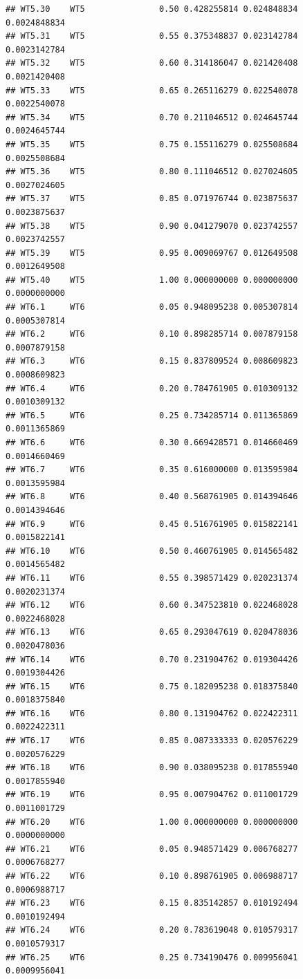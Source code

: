 \documentclass[
]{book}
\begin{document}
\begin{verbatim}
## WT5.30    WT5               0.50 0.428255814 0.024848834 0.0024848834
## WT5.31    WT5               0.55 0.375348837 0.023142784 0.0023142784
## WT5.32    WT5               0.60 0.314186047 0.021420408 0.0021420408
## WT5.33    WT5               0.65 0.265116279 0.022540078 0.0022540078
## WT5.34    WT5               0.70 0.211046512 0.024645744 0.0024645744
## WT5.35    WT5               0.75 0.155116279 0.025508684 0.0025508684
## WT5.36    WT5               0.80 0.111046512 0.027024605 0.0027024605
## WT5.37    WT5               0.85 0.071976744 0.023875637 0.0023875637
## WT5.38    WT5               0.90 0.041279070 0.023742557 0.0023742557
## WT5.39    WT5               0.95 0.009069767 0.012649508 0.0012649508
## WT5.40    WT5               1.00 0.000000000 0.000000000 0.0000000000
## WT6.1     WT6               0.05 0.948095238 0.005307814 0.0005307814
## WT6.2     WT6               0.10 0.898285714 0.007879158 0.0007879158
## WT6.3     WT6               0.15 0.837809524 0.008609823 0.0008609823
## WT6.4     WT6               0.20 0.784761905 0.010309132 0.0010309132
## WT6.5     WT6               0.25 0.734285714 0.011365869 0.0011365869
## WT6.6     WT6               0.30 0.669428571 0.014660469 0.0014660469
## WT6.7     WT6               0.35 0.616000000 0.013595984 0.0013595984
## WT6.8     WT6               0.40 0.568761905 0.014394646 0.0014394646
## WT6.9     WT6               0.45 0.516761905 0.015822141 0.0015822141
## WT6.10    WT6               0.50 0.460761905 0.014565482 0.0014565482
## WT6.11    WT6               0.55 0.398571429 0.020231374 0.0020231374
## WT6.12    WT6               0.60 0.347523810 0.022468028 0.0022468028
## WT6.13    WT6               0.65 0.293047619 0.020478036 0.0020478036
## WT6.14    WT6               0.70 0.231904762 0.019304426 0.0019304426
## WT6.15    WT6               0.75 0.182095238 0.018375840 0.0018375840
## WT6.16    WT6               0.80 0.131904762 0.022422311 0.0022422311
## WT6.17    WT6               0.85 0.087333333 0.020576229 0.0020576229
## WT6.18    WT6               0.90 0.038095238 0.017855940 0.0017855940
## WT6.19    WT6               0.95 0.007904762 0.011001729 0.0011001729
## WT6.20    WT6               1.00 0.000000000 0.000000000 0.0000000000
## WT6.21    WT6               0.05 0.948571429 0.006768277 0.0006768277
## WT6.22    WT6               0.10 0.898761905 0.006988717 0.0006988717
## WT6.23    WT6               0.15 0.835142857 0.010192494 0.0010192494
## WT6.24    WT6               0.20 0.783619048 0.010579317 0.0010579317
## WT6.25    WT6               0.25 0.734190476 0.009956041 0.0009956041

\end{verbatim}
\end{document}
